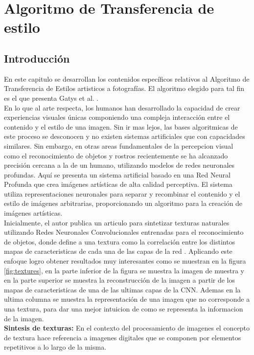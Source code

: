 \documentclass[a4paper,11pt,spanish]{book}
\begin{document}
\chapter{Algoritmo de Transferencia de estilo}
    \section{Introducción}
      En este capitulo se desarrollan los contenidos específicos relativos al Algoritmo de Transferencia de Estilos artisticos a fotografías. El algoritmo elegido para tal fin es el que
      presenta Gatys et al. \cite{Gatys:Neural_Style}. \\
      En lo que al arte respecta, los humanos han desarrollado la capacidad de crear experiencias visuales únicas componiendo una compleja interacción entre el contenido y el estilo de una imagen.
      Sin ir mas lejos, las bases algoritmicas de este proceso se desconocen y no existen sistemas artificiales que con capacidades similares. Sin embargo, en otras areas fundamentales
      de la percepcion visual como el reconocimiento de objetos y rostros recientemente se ha alcanzado precisión cercana a la de un humano, utilizando modelos de redes neuronales profundas.
      Aquí se presenta un sistema artificial basado en una Red Neural Profunda que crea imágenes artísticas de alta calidad perceptiva. El sistema utiliza representaciones neuronales
      para separar y recombinar el contenido y el estilo de imágenes arbitrarias, proporcionando un algoritmo para la creación de imágenes artísticas.\\
      Inicialmente, el autor publica un articulo para sintetizar texturas naturales utilizando Redes Neuronales Convolucionales entrenadas para el reconocimiento de objetos,
      donde define a una textura como la correlación entre los distintos mapas de caracteristicas de cada una de las capas de la red \cite{Gatys:Texture_Synthesis}. Aplicando este enfoque
      logro obtener resultados muy interesantes como se muestran en la figura \ref{fig:textures}, en la parte inferior de la figura se muestra la imagen de muestra y en la parte superior
      se muestra la reconstrucción de la imagen a partir de los mapas de caracteristicas de una de las ultimas capas de la CNN. Ademas en la ultima columna se muestra la representación
      de una imagen que no corresponde a una textura, para dar una mejor intuicion de como se representa la informacion de la imagen.\\
      \textbf{Sintesis de texturas:}
      En el contexto del procesamiento de imagenes el concepto de textura hace referencia a imagenes digitales que se componen por elementos repetitivos a lo largo de la misma.
\end{document}

